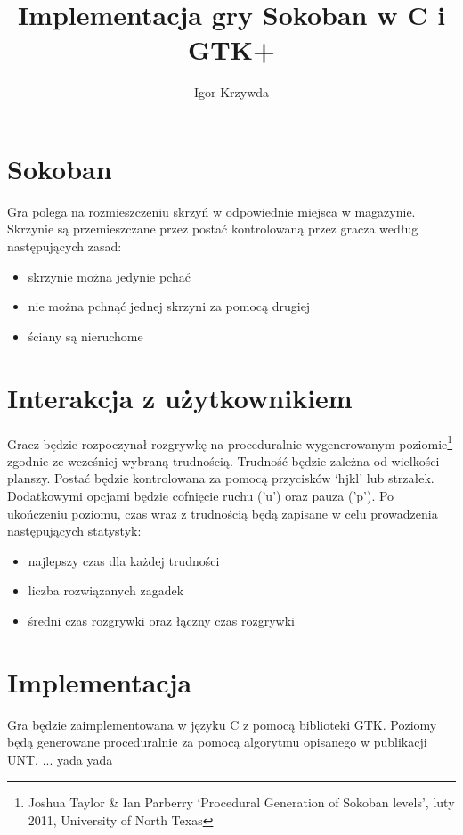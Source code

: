 \documentclass{article}
\begin{document}
\title{Implementacja gry Sokoban w C i GTK+}
\author{Igor Krzywda}

\maketitile

\section{Sokoban}

Gra polega na rozmieszczeniu skrzyń w odpowiednie miejsca w magazynie.
Skrzynie są przemieszczane przez postać kontrolowaną przez gracza według 
następujących zasad:
\begin{itemize}
    \item skrzynie można jedynie pchać
    \item nie można pchnąć jednej skrzyni za pomocą drugiej
    \item ściany są nieruchome
\end{itemize}

\section{Interakcja z użytkownikiem}

Gracz będzie rozpoczynał rozgrywkę na proceduralnie wygenerowanym
poziomie\footnote{Joshua Taylor \& Ian Parberry `Procedural 
Generation of Sokoban levels', luty 2011, University of North Texas} zgodnie
ze wcześniej wybraną trudnością. Trudność będzie zależna od wielkości planszy.
Postać będzie kontrolowana za pomocą przycisków `hjkl' lub strzałek.
Dodatkowymi opcjami będzie cofnięcie ruchu ('u') oraz pauza ('p'). Po
ukończeniu poziomu, czas wraz z trudnością będą zapisane w celu prowadzenia 
następujących statystyk:
\begin{itemize}
    \item najlepszy czas dla każdej trudności
    \item liczba rozwiązanych zagadek
    \item średni czas rozgrywki oraz łączny czas rozgrywki
\end{itemize}

\section{Implementacja}

Gra będzie zaimplementowana w języku C z pomocą biblioteki GTK. Poziomy
będą generowane proceduralnie za pomocą algorytmu opisanego w publikacji 
UNT. ... yada yada


\end{document}
